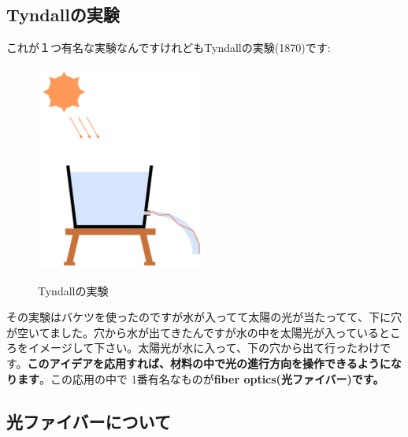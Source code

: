 \subsection{Tyndallの実験}
これが１つ有名な実験なんですけれどもTyndallの実験(1870)です:
\begin{figure}[H]
    \centering
    \includegraphics[width=0.5\textwidth]{lesson7/tyndall_cropped.pdf}
    \label{図: 1}
    \caption{Tyndallの実験}
\end{figure}

その実験はバケツを使ったのですが水が入ってて太陽の光が当たってて、下に穴が空いてました。穴から水が出てきたんですが水の中を太陽光が入っているところをイメージして下さい。太陽光が水に入って、下の穴から出て行ったわけです。\textbf{このアイデアを応用すれば、材料の中で光の進行方向を操作できるようになります}。この応用の中で 1番有名なものが\textbf{fiber optics(光ファイバー)です。}
\subsection{光ファイバーについて}

